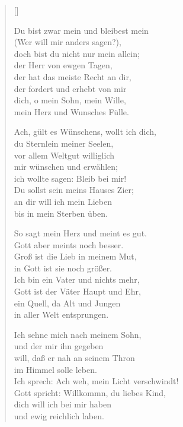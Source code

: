 \begin{multicols}{2}
\settowidth{\versewidth}{Du bist zwar mein und bleibest mein}
\begin{verse}[\versewidth]


 Du bist zwar mein und bleibest mein\\
(Wer will mir anders sagen?),\\
doch bist du nicht nur mein allein;\\
der Herr von ewgen Tagen,\\
der hat das meiste Recht an dir,\\
der fordert und erhebt von mir\\
dich, o mein Sohn, mein Wille,\\
mein Herz und Wunsches Fülle.

 Ach, gült es Wünschens, wollt ich dich,\\
du Sternlein meiner Seelen,\\
vor allem Weltgut williglich\\
mir wünschen und erwählen;\\
ich wollte sagen: Bleib bei mir!\\
Du sollst sein meins Hauses Zier;\\
an dir will ich mein Lieben\\
bis in mein Sterben üben.

 So sagt mein Herz und meint es gut.\\
Gott aber meints noch besser.\\
Groß ist die Lieb in meinem Mut,\\
in Gott ist sie noch größer.\\
Ich bin ein Vater und nichts mehr,\\
Gott ist der Väter Haupt und Ehr,\\
ein Quell, da Alt und Jungen\\
in aller Welt entsprungen.

 Ich sehne mich nach meinem Sohn,\\
und der mir ihn gegeben\\
will, daß er nah an seinem Thron\\
im Himmel solle leben.\\
Ich sprech: Ach weh, mein Licht verschwindt!\\
Gott spricht: Willkommn, du liebes Kind,\\
dich will ich bei mir haben\\
und ewig reichlich laben.


\end{verse}
\end{multicols}
